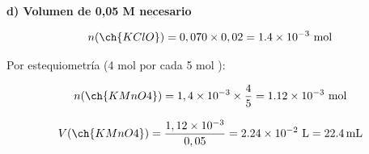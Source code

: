 \begin{exerciseEVAU}
\begin{solu}
        \textbf{d) Volumen de  0,05 M necesario}

        \begin{equation*}
            n(\ch{KClO}) = 0,070 \times 0,02 = \num{1.4e-3} \ \text{mol}
        \end{equation*}

        Por estequiometría (4 mol  por cada 5 mol ):

        \begin{equation*}
            n(\ch{KMnO4}) = 1,4\times10^{-3} \times \dfrac{4}{5} = \num{1.12e-3} \ \text{mol}
        \end{equation*}

        \begin{equation*}
            V(\ch{KMnO4}) = \dfrac{1,12\times10^{-3}}{0,05} = \num{2.24e-2} \ \si{\litre} = \SI{22.4}{\milli\litre}
        \end{equation*}

    \end{solu}
\end{exerciseEVAU}

